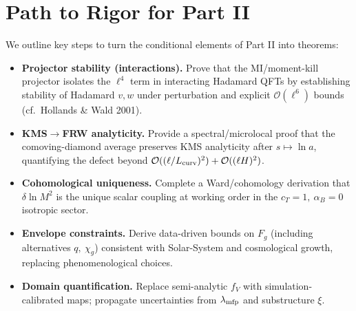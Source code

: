 \documentclass[aps,prd,onecolumn,superscriptaddress,nofootinbib]{revtex4-2}
\def\alpha{alpha}%
\def\alpha_M{alphaM}%
\begin{document}
\section{Path to Rigor for Part II}
\label{sec:path}
We outline key steps to turn the conditional elements of Part II into theorems:
\begin{itemize}[leftmargin=*]
  \item \textbf{Projector stability (interactions).} Prove that the MI/moment-kill projector isolates the \(\ell^4\) term in interacting Hadamard QFTs by establishing stability of Hadamard \(v,w\) under perturbation and explicit \(\mathcal O(\ell^6)\) bounds (cf.\ Hollands \& Wald 2001).
  \item \textbf{KMS\(\to\)FRW analyticity.} Provide a spectral/microlocal proof that the comoving-diamond average preserves KMS analyticity after \(s\mapsto \ln a\), quantifying the defect beyond \(\mathcal O((\ell/L_{\rm curv})^2)+\mathcal O((\ell H)^2)\).
  \item \textbf{Cohomological uniqueness.} Complete a Ward/cohomology derivation that \( \delta\ln M^2\) is the unique scalar coupling at working order in the \(c_T=1,\ \alpha_B=0\) isotropic sector.
  \item \textbf{Envelope constraints.} Derive data-driven bounds on \(F_g\) (including alternatives \(q,\ \chi_g\)) consistent with Solar-System and cosmological growth, replacing phenomenological choices.
  \item \textbf{Domain quantification.} Replace semi-analytic \(f_V\) with simulation-calibrated maps; propagate uncertainties from \(\lambda_{\rm mfp}\) and substructure \(\xi\).
\end{itemize}
\end{document}
